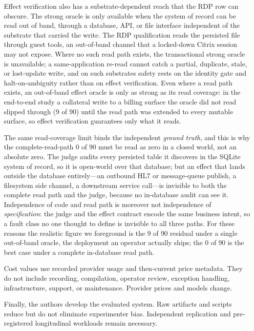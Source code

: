 Effect verification also has a substrate-dependent reach that the RDP row can
obscure. The strong oracle is only available when the system of record can be
read out of band, through a database, API, or file interface independent of the
substrate that carried the write. The RDP qualification reads the persisted file
through guest tools, an out-of-band channel that a locked-down Citrix session may
not expose. Where no such read path exists, the transactional strong oracle is
unavailable; a same-application re-read cannot catch a partial, duplicate, stale,
or lost-update write, and on such substrates safety rests on the identity gate
and halt-on-ambiguity rather than on effect verification. Even where a read path
exists, an out-of-band effect oracle is only as strong as its read coverage: in
the end-to-end study a collateral write to a billing surface the oracle did not
read slipped through (9 of 90) until the read path was extended to every mutable
surface, so effect verification guarantees only what it reads.

The same read-coverage limit binds the independent \emph{ground truth}, and this
is why the complete-read-path 0 of 90 must be read as zero in a closed world, not
an absolute zero. The judge audits every persisted table it discovers in the
SQLite system of record, so it is open-world over that database; but an effect
that lands outside the database entirely---an outbound HL7 or message-queue
publish, a filesystem side channel, a downstream service call---is invisible to
both the complete read path and the judge, because no in-database audit can see
it. Independence of code and read path is moreover not independence of
\emph{specification}: the judge and the effect contract encode the same business
intent, so a fault class no one thought to define is invisible to all three
paths. For these reasons the realistic figure we foreground is the 9 of 90
residual under a single out-of-band oracle, the deployment an operator actually
ships; the 0 of 90 is the best case under a complete in-database read path.

Cost values use recorded provider usage and then-current price metadata. They do
not include recording, compilation, operator review, exception handling,
infrastructure, support, or maintenance. Provider prices and models change.

Finally, the authors develop the evaluated system. Raw artifacts and scripts
reduce but do not eliminate experimenter bias. Independent replication and
pre-registered longitudinal workloads remain necessary.
